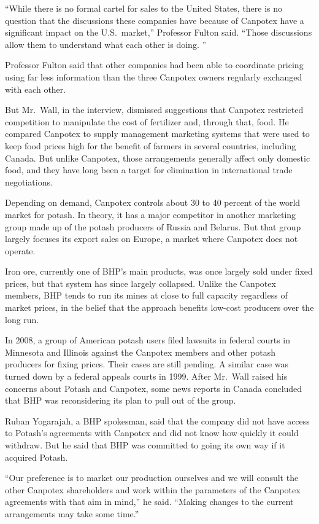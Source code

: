 ﻿\documentclass[12pt]{article}
\begin{document}
``While there is no formal cartel for sales to the United States, there is no question that the
discussions these companies have because of Canpotex have a significant impact on the U.S.~market,''
Professor Fulton said. ``Those discussions allow them to understand what each other is doing. ''

Professor Fulton said that other companies had been able to coordinate pricing using far less
information than the three Canpotex owners regularly exchanged with each other.

But Mr.~Wall, in the interview, dismissed suggestions that Canpotex restricted competition to
manipulate the cost of fertilizer and, through that, food. He compared Canpotex to supply management
marketing systems that were used to keep food prices high for the benefit of farmers in several
countries, including Canada. But unlike Canpotex, those arrangements generally affect only domestic
food, and they have long been a target for elimination in international trade negotiations.

Depending on demand, Canpotex controls about 30 to 40 percent of the world market for potash. In
theory, it has a major competitor in another marketing group made up of the potash producers of
Russia and Belarus. But that group largely focuses its export sales on Europe, a market where
Canpotex does not operate.

Iron ore, currently one of BHP's main products, was once largely sold under fixed prices, but that
system has since largely collapsed. Unlike the Canpotex members, BHP tends to run its mines at close
to full capacity regardless of market prices, in the belief that the approach benefits low-cost
producers over the long run.

In 2008, a group of American potash users filed lawsuits in federal courts in Minnesota and Illinois
against the Canpotex members and other potash producers for fixing prices. Their cases are still
pending. A similar case was turned down by a federal appeals courts in 1999. After Mr.~Wall raised
his concerns about Potash and Canpotex, some news reports in Canada concluded that BHP was
reconsidering its plan to pull out of the group.

Ruban Yogarajah, a BHP spokesman, said that the company did not have access to Potash's agreements
with Canpotex and did not know how quickly it could withdraw. But he said that BHP was committed to
going its own way if it acquired Potash.

``Our preference is to market our production ourselves and we will consult the other Canpotex
shareholders and work within the parameters of the Canpotex agreements with that aim in mind,'' he
said. ``Making changes to the current arrangements may take some time.''
\end{document}

